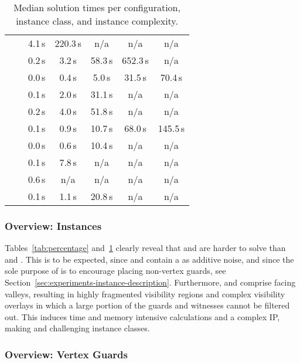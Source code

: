 \begin{table}
\begin{tabular}{|l|l|ccccc|}
			& \parabolawalk   &   4.1\,s & 220.3\,s &      n/a &      n/a &      n/a \\
			& \concavevalleys &   0.2\,s &   3.2\,s &  58.3\,s & 652.3\,s &      n/a \\
		\hline
		\multirow{4}{*}{\pnodom}
			& \walk           &   0.0\,s &   0.4\,s &   5.0\,s &  31.5\,s &  70.4\,s \\
			& \sinewalk       &   0.1\,s &   2.0\,s &  31.1\,s &      n/a &      n/a \\
			& \parabolawalk   &   0.2\,s &   4.0\,s &  51.8\,s &      n/a &      n/a \\
			& \concavevalleys &   0.1\,s &   0.9\,s &  10.7\,s &  68.0\,s & 145.5\,s \\
		\hline
		\multirow{4}{*}{\pnow}
			& \walk           &   0.0\,s &   0.6\,s &  10.4\,s &      n/a &      n/a \\
			& \sinewalk       &   0.1\,s &   7.8\,s &      n/a &      n/a &      n/a \\
			& \parabolawalk   &   0.6\,s &      n/a &      n/a &      n/a &      n/a \\
			& \concavevalleys &   0.1\,s &   1.1\,s &  20.8\,s &      n/a &      n/a \\
		\hline
	\end{tabular}
	\caption{Median solution times per configuration, instance class, and instance complexity.}
	\label{tab:time}
\end{table}

\subsubsection{Overview: Instances}
\label{sec:experiments-instances}

Tables~\ref{tab:percentage} and~\ref{tab:time} clearly reveal that \sinewalk and \parabolawalk are harder to solve than \walk and \concavevalleys.
This is to be expected, since \sinewalk and \parabolawalk contain a \walk as additive noise, and since the sole purpose of \concavevalleys is to encourage placing non-vertex guards, see Section~\ref{sec:experiments-instance-description}.
Furthermore, \sinewalk and \parabolawalk comprise facing valleys, resulting in highly fragmented visibility regions and complex visibility overlays in which a large portion of the guards and witnesses cannot be filtered out.
This induces time and memory intensive calculations and a complex \ac{IP}, making \sinewalk and \parabolawalk challenging instance classes.

\subsubsection{Overview: Vertex Guards}
\label{sec:experiments-vertex}

